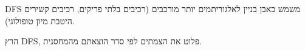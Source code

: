 DFS
משמש כאבן בניין לאלגוריתמים יותר מורכבים (רכיבים בלתי פריקים, רכיבים קשירים היטבת מיון טופולוגי).
\begin{example}
הרץ DFS, פלוט את הצמתים לפי סדר הוצאתם מהמחסנית.
\end{example}

